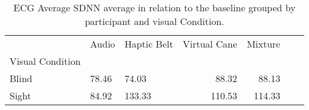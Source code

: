 
\begin{table}[!htb]
\centering
\caption{ECG Average SDNN average in relation to the baseline grouped by participant and visual Condition.}
\label{tab:sdnn_average_group_noBase}
\begin{tabular}{lllrrrr}
\toprule
{} &  Audio & Haptic Belt & Virtual Cane & Mixture \\
Visual Condition &        &             &              &         \\
\midrule
Blind            &  78.46 &       74.03 &        88.32 &   88.13 \\
Sight            &  84.92 &      133.33 &       110.53 &  114.33 \\
\bottomrule
\end{tabular}
\end{table}

